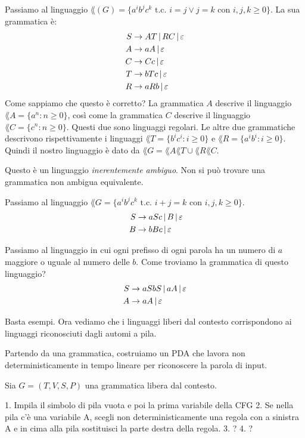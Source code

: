 Passiamo al linguaggio $\lang(G) = \{ a^i b^j c^k \text{ t.c. } i = j \lor j = k \text{ con } i,j,k \ge 0 \}$.
La sua grammatica \`e:
\begin{align*}
	S &\to AT \, | \, RC \, | \, \varepsilon \\
	A &\to aA \, | \, \varepsilon \\
	C &\to Cc \, | \, \varepsilon \\
	T &\to bTc \, | \, \varepsilon \\
	R &\to aRb \, | \, \varepsilon 
\end{align*}
Come sappiamo che questo \`e corretto?
La grammatica $A$ descrive il linguaggio $\lang{A} = \{ a^n : n \ge 0 \}$, cos\`i come la grammatica $C$ descrive il linguaggio $\lang{C} = \{c^n : n \ge 0\}$.
Questi due sono linguaggi regolari.
Le altre due grammatiche descrivono rispettivamente i linguaggi $\lang{T} = \{ b^i c^i : i \ge 0 \}$ e $\lang{R} = \{ a^i b^i : i \ge 0 \}$.
Quindi il nostro linguaggio \`e dato da $\lang{G} = \lang{A}\lang{T} \cup \lang{R}\lang{C}$.

Questo \`e un linguaggio \emph{inerentemente ambiguo}.
Non si pu\`o trovare una grammatica non ambigua equivalente.

Passiamo al linguaggio $\lang{G} = \{ a^i b^j c^k \text{ t.c. } i + j = k \text{ con } i,j,k \ge 0 \}$.
\begin{align*}
	S &\to aSc \, | \, B \, | \, \varepsilon \\\
	B &\to bBc \, | \, \varepsilon
\end{align*}

Passiamo al linguaggio in cui ogni prefisso di ogni parola ha un numero di $a$ maggiore o uguale al numero delle $b$.
Come troviamo la grammatica di questo linguaggio?
\begin{align*}
	S &\to aSbS \, | \, aA \, | \, \varepsilon \\
	A &\to aA \, | \, \varepsilon
\end{align*}

Basta esempi.
Ora vediamo che i linguaggi liberi dal contesto corrispondono ai linguaggi riconosciuti dagli automi a pila.

Partendo da una grammatica, costruiamo un PDA che lavora non deterministicamente in tempo lineare per riconoscere la parola di input.

Sia $G = (T, V, S, P)$ una grammatica libera dal contesto.

1. Impila il simbolo di pila vuota e poi la prima variabile della CFG
2. Se nella pila c'\`e una variabile A, scegli non deterministicamente una regola con a sinistra A e in cima alla pila sostituisci la parte destra della regola.
3. ?
4. ?

